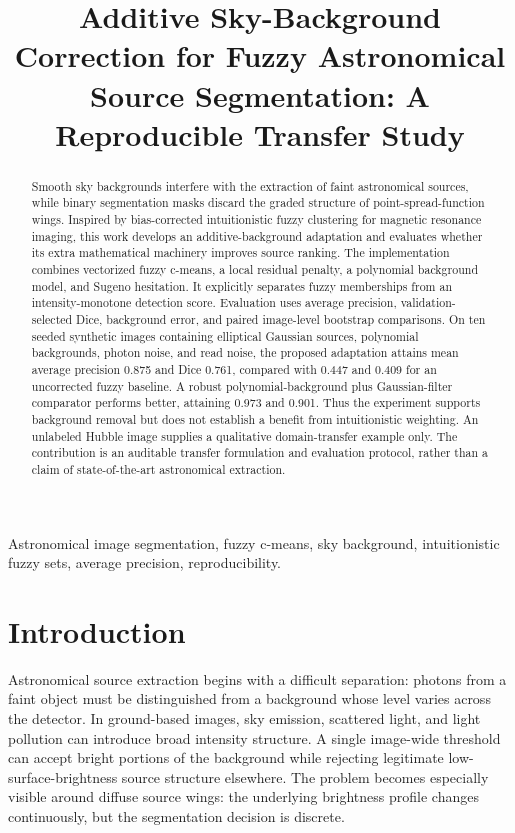 \documentclass[conference]{IEEEtran}
\title{Additive Sky-Background Correction for Fuzzy Astronomical Source Segmentation: A Reproducible Transfer Study}
\author{\IEEEauthorblockN{Anonymous Undergraduate Research Manuscript}\IEEEauthorblockA{Mathematics and Computing\\Reproducible computational study, October 2026}}
\begin{document}
\maketitle
\begin{abstract}
Smooth sky backgrounds interfere with the extraction of faint astronomical sources, while binary segmentation masks discard the graded structure of point-spread-function wings. Inspired by bias-corrected intuitionistic fuzzy clustering for magnetic resonance imaging, this work develops an additive-background adaptation and evaluates whether its extra mathematical machinery improves source ranking. The implementation combines vectorized fuzzy c-means, a local residual penalty, a polynomial background model, and Sugeno hesitation. It explicitly separates fuzzy memberships from an intensity-monotone detection score. Evaluation uses average precision, validation-selected Dice, background error, and paired image-level bootstrap comparisons. On ten seeded synthetic images containing elliptical Gaussian sources, polynomial backgrounds, photon noise, and read noise, the proposed adaptation attains mean average precision 0.875 and Dice 0.761, compared with 0.447 and 0.409 for an uncorrected fuzzy baseline. A robust polynomial-background plus Gaussian-filter comparator performs better, attaining 0.973 and 0.901. Thus the experiment supports background removal but does not establish a benefit from intuitionistic weighting. An unlabeled Hubble image supplies a qualitative domain-transfer example only. The contribution is an auditable transfer formulation and evaluation protocol, rather than a claim of state-of-the-art astronomical extraction.
\end{abstract}
\begin{IEEEkeywords}
Astronomical image segmentation, fuzzy c-means, sky background, intuitionistic fuzzy sets, average precision, reproducibility.
\end{IEEEkeywords}

\section{Introduction}
Astronomical source extraction begins with a difficult separation: photons from a faint object must be distinguished from a background whose level varies across the detector. In ground-based images, sky emission, scattered light, and light pollution can introduce broad intensity structure. A single image-wide threshold can accept bright portions of the background while rejecting legitimate low-surface-brightness source structure elsewhere. The problem becomes especially visible around diffuse source wings: the underlying brightness profile changes continuously, but the segmentation decision is discrete.
\end{document}
